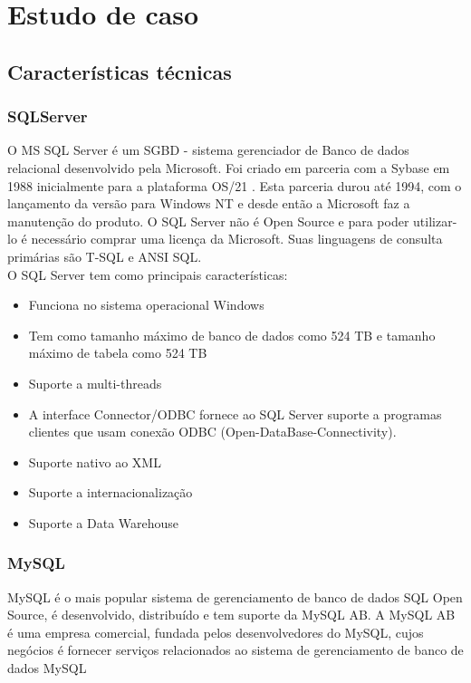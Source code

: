 \documentclass[conference]{IEEEtran}
\begin{document}
\section{Estudo de caso}
  \subsection{Características técnicas}
    \subsubsection{SQLServer }
    O MS SQL Server é um SGBD - sistema gerenciador de Banco de dados relacional desenvolvido pela Microsoft. Foi criado em parceria com a Sybase em 1988 inicialmente para a plataforma OS/21 . Esta parceria durou até 1994, com o lançamento da versão para Windows NT e desde então a Microsoft faz a manutenção do produto. O SQL Server não é Open Source e para poder utilizar-lo é necessário comprar uma licença da Microsoft. Suas linguagens de consulta primárias são T-SQL e ANSI SQL.\\
    
    O SQL Server tem como principais características:
    \begin{itemize}
    \item Funciona no sistema operacional Windows
    \item Tem como tamanho máximo de banco de dados como 524 TB  e tamanho máximo de tabela como 524 TB
    \item Suporte a multi-threads
    \item A interface Connector/ODBC fornece ao SQL Server suporte a programas clientes que usam conexão ODBC (Open-DataBase-Connectivity).
    \item Suporte nativo ao XML
    \item Suporte a internacionalização
    \item Suporte a Data Warehouse
    \end{itemize}

    \subsubsection{MySQL}
	  MySQL é o mais popular sistema de gerenciamento de banco de dados SQL Open Source, é desenvolvido, distribuído e tem suporte da MySQL AB. A MySQL AB é uma empresa comercial, fundada pelos desenvolvedores do MySQL, cujos negócios é fornecer serviços relacionados ao sistema de gerenciamento de banco de dados MySQL\\
	  
\end{document}
